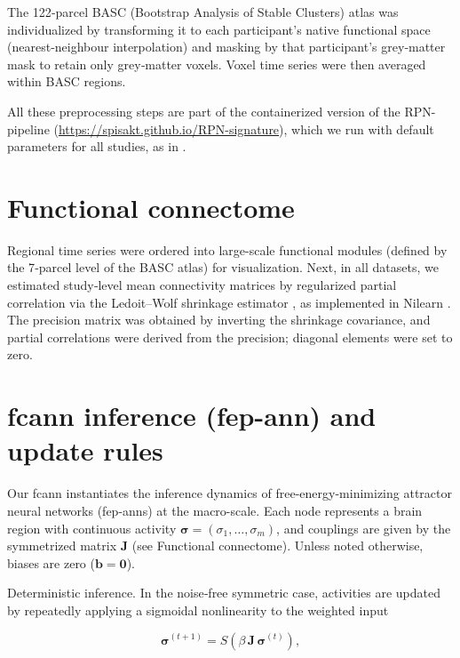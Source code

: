 \documentclass{article}
\begin{document}
The 122‑parcel BASC (Bootstrap Analysis of Stable Clusters) atlas \citep{bellec2010multi} was individualized by transforming it to each participant's native functional space (nearest‑neighbour interpolation) and masking by that participant's grey‑matter mask to retain only grey‑matter voxels. Voxel time series were then averaged within BASC regions.

All these preprocessing steps are part of the containerized version of the RPN-pipeline (\href{https://spisakt.github.io/RPN-signature}{https://spisakt.github.io/RPN-signature}), which we run with default parameters for all studies, as in \cite{Spisak_2020}.

\section{Functional connectome}

Regional time series were ordered into large-scale functional modules (defined by the 7‑parcel level of the BASC atlas) for visualization.
Next, in all datasets, we estimated study‑level mean connectivity matrices by regularized partial correlation via the Ledoit--Wolf shrinkage estimator \citep{Ledoit_2004}, as implemented in Nilearn \citep{abraham2014machine}. The precision matrix was obtained by inverting the shrinkage covariance, and partial correlations were derived from the precision; diagonal elements were set to zero.

\section{\acrshort{fcann} inference (\acrshort{fep-ann}) and update rules}

Our \acrshort{fcann} instantiates the inference dynamics of free-energy-minimizing attractor neural networks (\acrshort{fep-ann}s) at the macro-scale. Each node represents a brain region with continuous activity $\boldsymbol{\sigma} = (\sigma_1,\dots,\sigma_m)$, and couplings are given by the symmetrized matrix $\boldsymbol{J}$ (see Functional connectome). Unless noted otherwise, biases are zero ($\boldsymbol{b}=\boldsymbol{0}$).

Deterministic inference. In the noise‑free symmetric case, activities are updated by repeate\acrshort{dl}y applying a sigmoidal nonlinearity to the weighted input

\begin{equation}
\label{fep-deterministic-update}
\boldsymbol{\sigma}^{(t+1)} = S\!\left( \beta\, \boldsymbol{J}\, \boldsymbol{\sigma}^{(t)} \right),
\end{equation}
\end{document}
